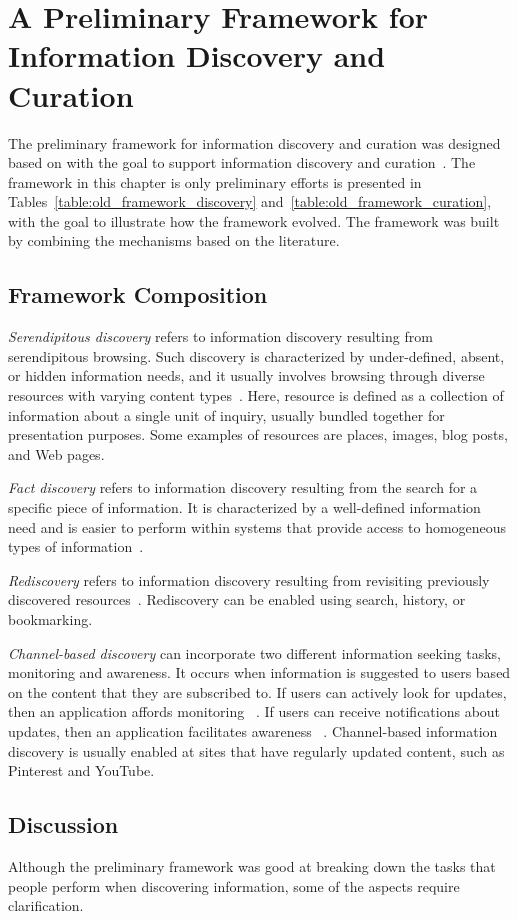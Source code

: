 \chapter{A Preliminary Framework for Information Discovery and Curation}
\label{chapter:old_framework}
The preliminary framework for information discovery and curation was designed based on with the goal to support information discovery and curation~\cite{voyloshnikova2014}. The framework in this chapter is only preliminary efforts is presented in Tables~\ref{table:old_framework_discovery} and~\ref{table:old_framework_curation}, with the goal to illustrate how the framework evolved. The framework was built by combining the mechanisms based on the literature. 

{\section{Framework Composition}
\textit{Serendipitous discovery} refers to information discovery resulting from serendipitous browsing. Such discovery is characterized by under-defined, absent, or hidden information needs, and it usually involves browsing through diverse resources with varying content types~\cite{kellar2006goal, kellar2007field}. Here, resource is defined as a collection of information about a single unit of inquiry, usually bundled together for presentation purposes. Some examples of resources are places, images, blog posts, and Web pages.

\textit{Fact discovery} refers to information discovery resulting from the search for a specific piece of information. It is characterized by a well-defined information need and is easier to perform within systems that provide access to homogeneous types of information~\cite{kellar2006goal, lindley2012s}.

\textit{Rediscovery} refers to information discovery resulting from revisiting previously discovered resources~\cite{tauscher1997people}. Rediscovery can be enabled using search, history, or bookmarking.

\textit{Channel-based discovery} can incorporate two different information seeking tasks, monitoring and awareness. It occurs when information is suggested to users based on the content that they are subscribed to. If users can actively look for updates, then an application affords monitoring ~\cite{morrison2001taxonomic}. If users can receive notifications about updates, then an application facilitates awareness ~\cite{bates1986exploratory,bates2002toward}. Channel-based information discovery is usually enabled at sites that have regularly updated content, such as Pinterest and YouTube.                            

} %
{\section{Discussion}
Although the preliminary framework was good at breaking down the tasks that people perform when discovering information, some of the aspects require clarification. 
} %


